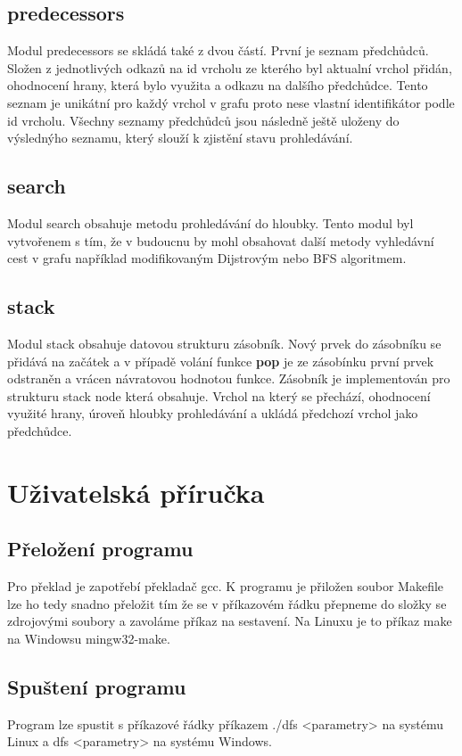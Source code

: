 \section{predecessors}
Modul predecessors se skládá také z dvou částí. První je seznam předchůdců. Složen z jednotlivých odkazů na id vrcholu ze kterého byl aktualní vrchol přidán, ohodnocení hrany, která bylo využita a odkazu na dalšího předchůdce. Tento seznam je unikátní pro každý vrchol v grafu proto nese vlastní identifikátor podle id vrcholu. Všechny seznamy předchůdců jsou následně ještě uloženy do výslednýho seznamu, který slouží k zjistění stavu prohledávání.

\section{search}
Modul search obsahuje metodu prohledávání do hloubky. Tento modul byl vytvořenem s tím, že v budoucnu by mohl obsahovat další metody vyhledávní cest v grafu například modifikovaným Dijstrovým nebo BFS algoritmem.

\section{stack}
Modul stack obsahuje datovou strukturu zásobník. Nový prvek do zásobníku se přidává na začátek a v případě volání funkce \textbf{pop} je	ze zásobínku první prvek odstraněn a vrácen návratovou hodnotou funkce. Zásobník je implementován pro strukturu stack node která obsahuje. Vrchol na který se přechází, ohodnocení využité hrany, úroveň hloubky prohledávání a ukládá předchozí vrchol jako předchůdce.

\chapter{Uživatelská příručka}
\section{Přeložení programu}
Pro překlad je zapotřebí překladač gcc. K programu je přiložen soubor Makefile lze ho tedy snadno přeložit tím že se v příkazovém řádku přepneme do složky se zdrojovými soubory a zavoláme příkaz na sestavení. Na Linuxu je to příkaz make na Windowsu mingw32-make.

\section{Spuštení programu}
Program lze spustit s příkazové řádky příkazem ./dfs <parametry> na systému Linux a dfs <parametry> na systému Windows.\\


